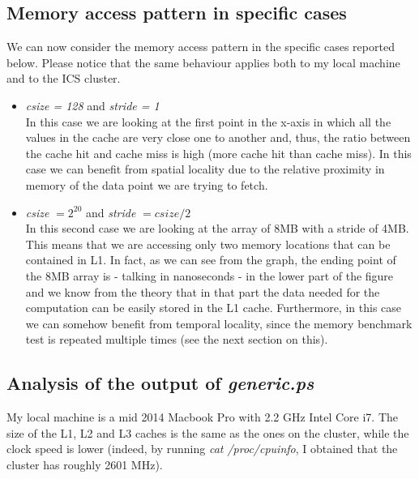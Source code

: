 \documentclass[unicode,11pt,a4paper,oneside,numbers=endperiod,openany]{scrartcl}
\begin{document}
\subsection{Memory access pattern in specific cases}
We can now consider the memory access pattern in the specific cases reported below. Please notice that the same behaviour applies both to my local machine and to the ICS cluster.
\begin{itemize}
	\item \textit{csize = 128} and \textit{stride = 1} \\ In this case we are looking at the first point in the x-axis in which all the values in the cache are very close one to another and, thus, the ratio between the cache hit and cache miss is high (more cache hit than cache miss). In this case we can benefit from spatial locality due to the relative proximity in memory of the data point we are trying to fetch.
	\item \textit{csize} $= 2^{20}$ and \textit{stride} $ = csize/2$ \\ In this second case we are looking at the array of 8MB with a stride of 4MB. This means that we are accessing only two memory locations that can be contained in L1. In fact, as we can see from the graph, the ending point of the 8MB array is - talking in nanoseconds - in the lower part of the figure and we know from the theory that in that part the data needed for the computation can be easily stored in the L1 cache. Furthermore, in this case we can somehow benefit from temporal locality, since the memory benchmark test is repeated multiple times (see the next section on this).
\end{itemize}

\subsection{Analysis of the output of \emph{generic.ps}}

My local machine is a mid 2014 Macbook Pro with 2.2 GHz Intel Core i7. The size of the L1, L2 and L3 caches is the same as the ones on the cluster, while the clock speed is lower (indeed, by running \emph{cat /proc/cpuinfo}, I obtained that the cluster has roughly 2601 MHz).
\end{document}
